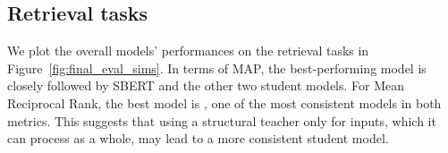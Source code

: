 














\subsection{Retrieval tasks}

We plot the overall models' performances on the retrieval tasks in
Figure~\ref{fig:final_eval_sims}. In terms of MAP, the best-performing model is
{\OnlyMSEStudent} closely followed by SBERT and the other two student models.
For Mean Reciprocal Rank, the best model is {\CosineStudent}, one
of the most consistent models in both metrics. This suggests that using
a structural teacher only for inputs, which it can process as a whole, may lead to a
more consistent student model.

